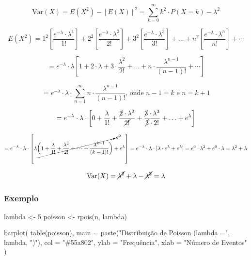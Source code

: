 \documentclass[
]{article}
\newenvironment{Shaded}{\begin{snugshade}}{\end{snugshade}}
\newcommand{\AttributeTok}[1]{\textcolor[rgb]{0.77,0.63,0.00}{#1}}
\newcommand{\DecValTok}[1]{\textcolor[rgb]{0.00,0.00,0.81}{#1}}
\newcommand{\FunctionTok}[1]{\textcolor[rgb]{0.00,0.00,0.00}{#1}}
\newcommand{\NormalTok}[1]{#1}
\newcommand{\OtherTok}[1]{\textcolor[rgb]{0.56,0.35,0.01}{#1}}
\newcommand{\StringTok}[1]{\textcolor[rgb]{0.31,0.60,0.02}{#1}}
\begin{document}
\[
\text{Var}(X) = E(X^2) - [E(X)]^2 = \sum_{k=0}^{\infty} k^2 \cdot P(X = k) - \lambda^2 
\]

\[ 
E(X^2)= 1^2\left[\frac{e^{-\lambda} \cdot \lambda^1}{1!}\right] + 2^2\left[\frac{e^{-\lambda} \cdot \lambda^2}{2!}\right] + 3^2\left[\frac{e^{-\lambda} \cdot \lambda^3}{3!}\right] + \ldots +  n^2\left[\frac{e^{-\lambda} \cdot \lambda^n}{n!} \right] + \cdots
\]

\[
= e^{-\lambda} \cdot \lambda \left[1 + 2\cdot\lambda + 3\cdot\frac{\lambda^2}{2!} + \ldots + n\cdot\frac{\lambda^{n-1}}{(n-1)!} + \cdots \right]
\]

\[
= e^{-\lambda} \cdot \lambda \cdot \sum_{n=1}^{\infty} n \cdot \frac{\lambda^{n-1}}{(n-1)!}\text{, onde } n - 1 = k \text{ e } n = k + 1 
\]

\[
= e^{-\lambda} \cdot \lambda \cdot \left[
0 + \frac{\lambda}{1!} + \frac{\cancel{2}\cdot \lambda^2}{\cancel{2!}} + \frac{\cancel{3}\cdot \lambda^{3}}{\cancel{3}\cdot 2!} + \ldots + e^{\lambda}
\right]
\]

\[
= e^{-\lambda} \cdot \lambda \cdot \left[
\lambda \cancelto{e^{\lambda}}{\left(1 + \frac{\lambda}{1!} + \frac{\lambda^2}{2!} + \cdots + \frac{\lambda^{k-1}}{(k-1)!}\right)} + e^{\lambda}
\right] = e^{-\lambda} \cdot \lambda \cdot [\lambda \cdot e^{\lambda} + e^{\lambda}] = e^{0} \cdot \lambda^2 + e^{0} \cdot \lambda = \lambda^2 + \lambda
\]

\[
\text{Var}(X) = \cancel{\lambda^2} + \lambda - \cancel{\lambda^2} = \lambda
\]

\hypertarget{exemplo-poisson}{%
\subsubsection{Exemplo}\label{exemplo-poisson}}

\begin{Shaded}
\begin{Highlighting}[]
\NormalTok{lambda }\OtherTok{\textless{}{-}} \DecValTok{5}
\NormalTok{poisson }\OtherTok{\textless{}{-}} \FunctionTok{rpois}\NormalTok{(n, lambda)}

\FunctionTok{barplot}\NormalTok{(}
  \FunctionTok{table}\NormalTok{(poisson),}
  \AttributeTok{main =} \FunctionTok{paste}\NormalTok{(}\StringTok{"Distribuição de Poisson (lambda ="}\NormalTok{, lambda, }\StringTok{")"}\NormalTok{),}
  \AttributeTok{col =} \StringTok{"\#55a802"}\NormalTok{,}
  \AttributeTok{ylab =} \StringTok{"Frequência"}\NormalTok{,}
  \AttributeTok{xlab =} \StringTok{"Número de Eventos"}
\NormalTok{)}
\end{Highlighting}
\end{Shaded}
\end{document}
